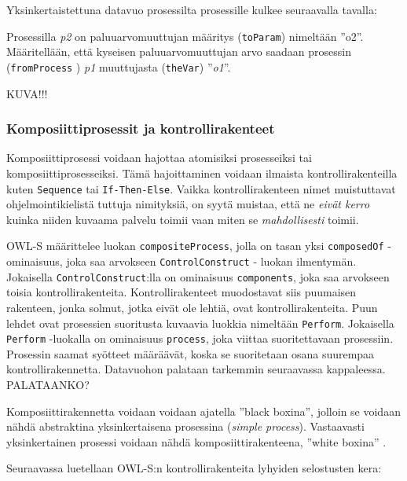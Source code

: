 \documentclass[finnish]{tktltiki2}
\theoremstyle{definition}
\theoremstyle{remark}
\begin{document}
Yksinkertaistettuna datavuo prosessilta prosessille kulkee seuraavalla tavalla: 

Prosessilla \textit{p2} on paluuarvomuuttujan määritys (\texttt{toParam}) nimeltään ''o2''. Määritellään, että kyseisen paluuarvomuuttujan arvo saadaan prosessin (\texttt{fromProcess} ) \textit{p1} muuttujasta (\texttt{theVar}) ''\textit{o1}''.  

KUVA!!!

\subsubsection{Komposiittiprosessit ja kontrollirakenteet}

Komposiittiprosessi voidaan hajottaa atomisiksi prosesseiksi tai komposiittiprosesseiksi\cite{OWLS}. Tämä hajoittaminen voidaan ilmaista kontrollirakenteilla kuten \texttt{Sequence} tai \texttt{If-Then-Else}. Vaikka kontrollirakenteen nimet muistuttavat ohjelmointikielistä tuttuja nimityksiä, on syytä muistaa, että ne \textit{eivät kerro} kuinka niiden kuvaama palvelu toimii vaan miten se \textit{mahdollisesti} toimii\cite{OWLS}. 

OWL-S määrittelee luokan \texttt{compositeProcess}, jolla on tasan yksi \texttt{composedOf} -ominaisuus, joka saa arvokseen \texttt{ControlConstruct} - luokan ilmentymän. Jokaisella \texttt{ControlConstruct}:lla on ominaisuus \texttt{components}, joka saa arvokseen toisia kontrollirakenteita\cite{OWLS}. Kontrollirakenteet muodostavat siis puumaisen rakenteen, jonka solmut, jotka eivät ole lehtiä, ovat kontrollirakenteita. Puun lehdet ovat prosessien suoritusta kuvaavia luokkia nimeltään \texttt{Perform}. Jokaisella \texttt{Perform} -luokalla on ominaisuus \texttt{process}, joka viittaa suoritettavaan prosessiin\cite{OWLS}.  Prosessin saamat syötteet määräävät, koska se suoritetaan osana suurempaa kontrollirakennetta. Datavuohon palataan tarkemmin seuraavassa kappaleessa. PALATAANKO?

Komposiittirakennetta voidaan voidaan ajatella ''black boxina'', jolloin se voidaan nähdä abstraktina yksinkertaisena prosessina (\textit{simple process}). Vastaavasti yksinkertainen prosessi voidaan nähdä komposiittirakenteena, ''white boxina'' \cite{OWLS}. 

Seuraavassa luetellaan OWL-S:n kontrollirakenteita lyhyiden selostusten kera:      
 
\end{document}
